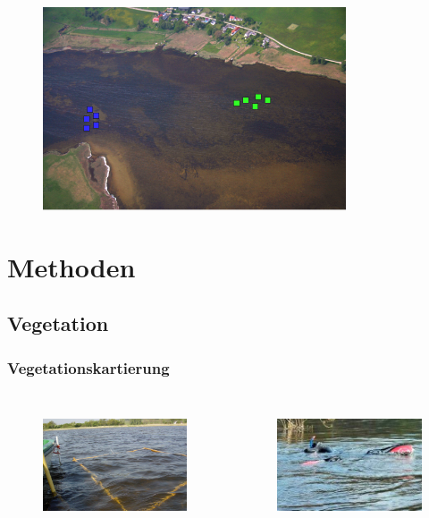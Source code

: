 \documentclass{beamer}
\begin{document}
\begin{frame}
\begin{figure}
\includegraphics[width=0.8\textwidth]{images/Fotos/griebenerbucht.png}
\end{figure}
\end{frame}

\section{Methoden}
\subsection{Vegetation}

\begin{frame}
\frametitle{Vegetationskartierung}
\begin{columns}
\begin{column}{5.5cm}
\begin{figure}
\includegraphics[height=35mm]{images/Fotos/vegetationsrahmen.jpg}
\end{figure}
\end{column}
\begin{column}{5.5cm}
\begin{figure}
\includegraphics[height=35mm]{images/Fotos/schnorchelnklein2.jpg}
\vspace*{+5mm}
\end{figure}
\end{column}
\end{columns}
\end{frame}
\end{document}
